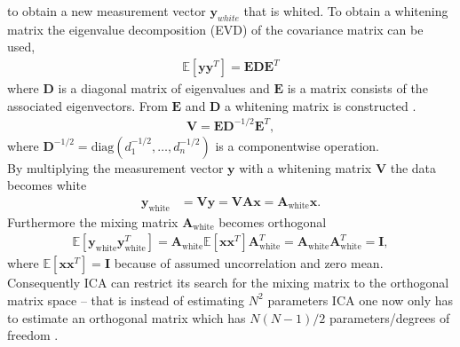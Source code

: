 to obtain a new measurement vector $\textbf{y}_{white}$ that is whited. 
To obtain a whitening matrix the eigenvalue decomposition (EVD) of the covariance matrix can be used,
\begin{align*}
\mathbb{E}[\mathbf{yy}^T] = \mathbf{EDE}^T
\end{align*}
where $\mathbf{D}$ is a diagonal matrix of eigenvalues and $\mathbf{E}$ is a matrix consists of the associated eigenvectors. 
From $\mathbf{E}$ and $\mathbf{D}$ a whitening matrix is constructed \cite[p.159]{ICA}.
\begin{align*}
\mathbf{V} = \mathbf{ED}^{-1/2} \mathbf{E}^T,
\end{align*}
where $\mathbf{D}^{-1/2} = \text{diag}(d_1^{-1/2},\dots, d_n^{-1/2})$ is a componentwise operation.
\\  
By multiplying the measurement vector $\mathbf{y}$ with a whitening matrix $\mathbf{V}$ the data becomes white
\begin{align}
\mathbf{y}_{\text{white}} &= \mathbf{Vy} = \mathbf{VAx} = \mathbf{A}_{\text{white}} \mathbf{x}. \nonumber
\end{align}
Furthermore the mixing matrix $\mathbf{A}_{\text{white}}$ becomes orthogonal 
\begin{align*}
 \mathbb{E}[\mathbf{y}_{\text{white}} \mathbf{y}_{\text{white}}^T] = \mathbf{A}_{\text{white}} \mathbb{E}[\mathbf{xx}^T] \mathbf{A}_{\text{white}}^T = \mathbf{A}_{\text{white}} \mathbf{A}_{\text{white}}^T = \mathbf{I},
 \end{align*} 
where $\mathbb{E}[\mathbf{xx}^T] = \mathbf{I}$ because of assumed uncorrelation and zero mean. Consequently ICA can restrict its search for the mixing matrix to the orthogonal matrix space -- that is instead of estimating $N^2$ parameters ICA one now only has to estimate an orthogonal matrix which has $N(N-1)/2$ parameters/degrees of freedom \cite[p. 159]{ICA}
.


